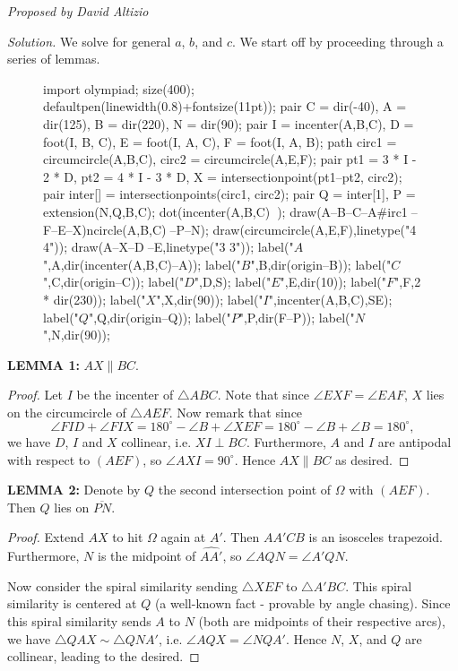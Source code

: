 \documentclass[10pt]{article}
\newcommand{\proposed}[1]
{
\vspace{5pt}
\noindent\textit{Proposed by #1}
}
\newcommand{\solution}
{
\vspace{5pt}
\noindent\textit{Solution.}\qquad
}
\newcounter{enum}
\begin{document}
\begin{enumerate}
\proposed{David Altizio}

\solution We solve for general $a$, $b$, and $c$.  We start off by proceeding through a series of lemmas.

\begin{figure}[h]
	\centering
	\begin{asy}
import olympiad;
size(400);
defaultpen(linewidth(0.8)+fontsize(11pt));
pair C = dir(-40), A = dir(125), B = dir(220), N = dir(90);
pair I = incenter(A,B,C), D = foot(I, B, C), E = foot(I, A, C), F = foot(I, A, B);
path circ1 = circumcircle(A,B,C), circ2 = circumcircle(A,E,F);
pair pt1 = 3 * I - 2 * D, pt2 = 4 * I - 3 * D, X = intersectionpoint(pt1--pt2, circ2);
pair inter[] = intersectionpoints(circ1, circ2);
pair Q = inter[1], P = extension(N,Q,B,C);
dot(incenter(A,B,C)^^N^^D);
draw(A--B--C--A^^circ1^^X--F--E--X^^incircle(A,B,C)^^B--P--N);
draw(circumcircle(A,E,F),linetype("4 4"));
draw(A--X--D^^P--E,linetype("3 3"));
label("$A$",A,dir(incenter(A,B,C)--A));
label("$B$",B,dir(origin--B));
label("$C$",C,dir(origin--C));
label("$D$",D,S);
label("$E$",E,dir(10));
label("$F$",F,2 * dir(230));
label("$X$",X,dir(90));
label("$I$",incenter(A,B,C),SE);
label("$Q$",Q,dir(origin--Q));
label("$P$",P,dir(F--P));
label("$N$",N,dir(90));
\end{asy}
\end{figure}

\par\textbf{LEMMA 1: }$AX\parallel BC$.

\begin{proof}Let $I$ be the incenter of $\triangle ABC$.  Note that since $\angle EXF=\angle EAF$, $X$ lies on the circumcircle of $\triangle AEF$.  Now remark that since \[\angle FID+\angle FIX=180^\circ-\angle B + \angle XEF=180^\circ-\angle B + \angle B = 180^\circ,\] we have $D$, $I$ and $X$ collinear, i.e. $XI\perp BC$.  Furthermore, $A$ and $I$ are antipodal with respect to $(AEF)$, so $\angle AXI=90^\circ$.  Hence $AX\parallel BC$ as desired.\end{proof}

\par\textbf{LEMMA 2: }Denote by  $Q$ the second intersection point of $\Omega$ with $(AEF)$.  Then $Q$ lies on $\overline{PN}$.

\begin{proof} Extend $AX$ to hit $\Omega$ again at $A'$.  Then $AA'CB$ is an isosceles trapezoid.  Furthermore, $N$ is the midpoint of $\widehat{AA'}$, so $\angle AQN=\angle A'QN$.

\par Now consider the spiral similarity sending $\triangle XEF$ to $\triangle A'BC$.  This spiral similarity is centered at $Q$ (a well-known fact - provable by angle chasing).  Since this spiral similarity sends $A$ to $N$ (both are midpoints of their respective arcs), we have $\triangle QAX\sim\triangle QNA'$, i.e. $\angle AQX=\angle NQA'$.  Hence $N$, $X$, and $Q$ are collinear, leading to the desired.
\end{proof}


\end{enumerate}
\end{document}
